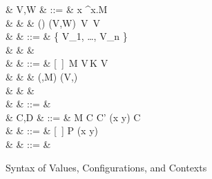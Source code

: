 \documentclass[a4paper]{article}
\begin{document}
\begin{figure}[float]
\begin{syntax}
   & V,W & ::= & x \mid \lambda^\sigma x.M \\
  & & \mid & () \mid (V,W) \mid {}\,V \mid {}\,V  \\
   & \sigma & ::= & \{  {V_1}, \dots,  {V_n} \} \\
  & & & \qquad{} \\
   & \Ex & ::= &  [~] \mid \Ex\,M \mid V\,\Ex \mid K \app V \mid {} \\
  & & \mid & (\Ex,M) \mid (V,\Ex) \mid {} \\
  & & \mid & \,\Ex \mid {}\,\Ex \mid {} \\
  & \Fx & ::= & \phi \Ex \\
   & C,D & ::= & \phi M \mid C \parallel C' \mid (\nu x y) C \mid {} \\
   & \Cx & ::= & [~] \mid \Cx \parallel P \mid (\nu x y)\Cx \\
   & \phi & ::= & \wcirc \mid \bcirc
\end{syntax}
\caption{Syntax of Values, Configurations, and Contexts}\label{fig:gv-eval-syntax}
\end{figure}
\end{document}

